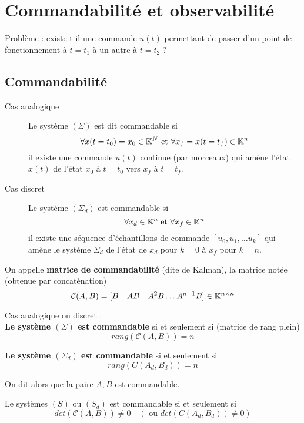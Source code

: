 \documentclass[main.tex]{subfiles}
\begin{document}
\section{Commandabilité et observabilité}

Problème : existe-t-il une commande $u(t)$ permettant de passer d'un point de fonctionnement à $t=t_1$ à un autre à $t=t_2$ ?

\subsection{Commandabilité}

\begin{defin}
  \begin{description}
  \item[Cas analogique]
Le système $(\Sigma)$ est dit commandable si \[\forall x(t=t_0)=x_0 \in \mathbb{K}^N \text{ et } \forall x_f=x(t=t_f)\in \mathbb{K}^n\] il existe une commande $u(t)$ continue (par morceaux) qui amène l'état $x(t)$ de l'état $x_0$ à $t=t_0$ vers $x_f$ à $t=t_f$.
\item[Cas discret]
  Le système $(\Sigma_d)$ est commandable si \[\forall x_d \in \mathbb{K}^n \text{ et } \forall x_f \in \mathbb{K}^n\] il existe une séquence d'échantillons de commande $[u_0,u_1,\dots u_k]$ qui amène le système $\Sigma_d$ de l'état de $x_d$ pour $k=0$ à $x_f$ pour $k=n$.
  \end{description}
\end{defin}

\begin{defin}
On appelle \textbf{matrice de commandabilité} (dite de Kalman), la matrice notée (obtenue par concaténation)
\[  \mathcal{C}(A,B) = [B \quad AB \quad A^2B \dots A^{n-1}B] \in \mathbb{K}^{n \times n} \]
\end{defin}

\begin{thm} Cas analogique ou discret : \\

\textbf{Le système $(\Sigma)$ est commandable} si et seulement si (matrice de rang plein)
\[ rang( \mathcal{C}(A,B)) = n \]

\textbf{Le système $(\Sigma_d)$ est commandable} si et seulement si
\[ rang( C(A_d,B_d)) = n \]

\end{thm}

On dit alors que la paire $A,B$ est commandable.

\begin{prop}
Le systèmes $(S)$ ou $(S_d)$ est commandable si et seulement si
\[ det (\mathcal{C}(A,B)) \neq 0 \quad (\text{ ou } det (C(A_d,B_d)) \neq 0) \]
\end{prop}
\end{document}

